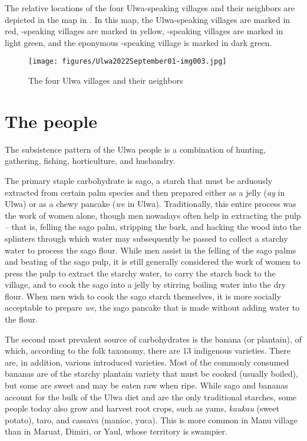 The relative locations of the four Ulwa-speaking villages and their neighbors are depicted in the map in . In this map, the Ulwa-speaking villages are marked in red, -speaking villages are marked in yellow, -speaking villages are marked in light green, and the eponymous -speaking village is marked in dark green.

\begin{figure}
\caption{The four Ulwa villages and their neighbors}
\label{fig:1.3}
\texttt{[image: figures/Ulwa2022September01-img003.jpg]}
\end{figure}

\section{The people}\label{sec:1.5.4}

The subsistence pattern of the Ulwa people is a combination of hunting, gathering, fishing, horticulture, and husbandry.

The primary staple carbohydrate is sago, a starch that must be arduously extracted from certain palm species and then prepared either as a jelly (\textit{ay} in Ulwa) or as a chewy pancake (\textit{we} in Ulwa). Traditionally, this entire process was the work of women alone, though men nowadays often help in extracting the pulp -- that is, felling the sago palm, stripping the bark, and hacking the wood into the splinters through which water may subsequently be passed to collect a starchy water to process the sago flour. While men assist in the felling of the sago palms and beating of the sago pulp, it is still generally considered the work of women to press the pulp to extract the starchy water, to carry the starch back to the village, and to cook the sago into a jelly by stirring boiling water into the dry flour. When men wish to cook the sago starch themselves, it is more socially acceptable to prepare \textit{we}, the sago pancake that is made without adding water to the flour.

The second most prevalent source of carbohydrates is the banana (or plantain), of which, according to the folk taxonomy, there are 13 indigenous varieties. There are, in addition, various introduced varieties. Most of the commonly consumed bananas are of the starchy plantain variety that must be cooked (usually boiled), but some are sweet and may be eaten raw when ripe. While sago and bananas account for the bulk of the Ulwa diet and are the only traditional starches, some people today also grow and harvest root crops, such as yams, \textit{kaukau} (sweet potato), taro, and cassava (manioc, yuca). This is more common in Manu village than in Maruat, Dimiri, or Yaul, whose territory is swampier.

